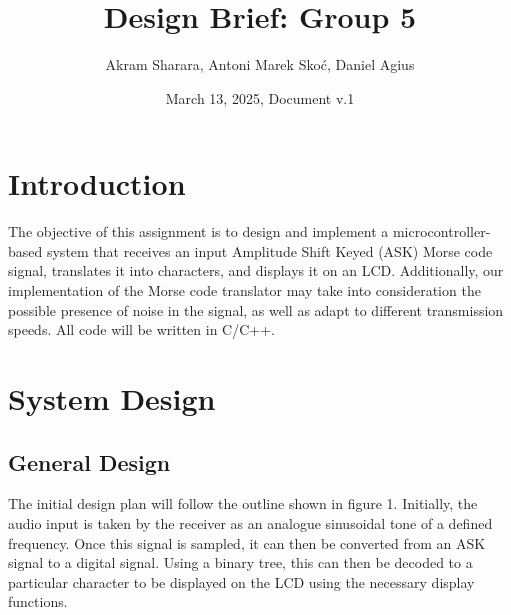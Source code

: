 \documentclass{cce2014-design}
\title{Design Brief: Group 5}
\author{
   Akram Sharara,
   Antoni Marek Skoć,
   Daniel Agius}
\date{March 13, 2025, Document v.1}
\begin{document}
\maketitle


\section{Introduction}
The objective of this assignment is to design and implement a microcontroller-based system that receives an input Amplitude Shift Keyed (ASK) Morse code signal, translates it into characters, and displays it on an LCD. Additionally, our implementation of the Morse code translator may take into consideration the possible presence of noise in the signal, as well as adapt to different transmission speeds. All code will be written in C/C++. 

\section{System Design}
\subsection{General Design}
The initial design plan will follow the outline shown in figure 1. Initially, the audio input is taken by the receiver as an analogue sinusoidal tone of a defined frequency. Once this signal is sampled, it can then be converted from an ASK signal to a digital signal. Using a binary tree, this can then be decoded to a particular character to be displayed on the LCD using the necessary display functions.
\end{document}
